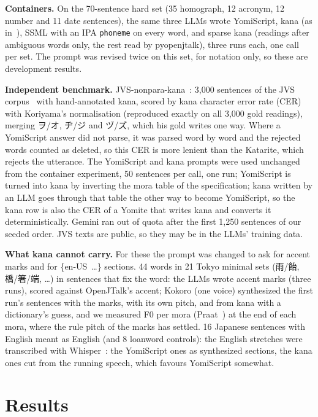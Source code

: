 \documentclass{Interspeech}
\newcommand{\ys}[1]{\mbox{\ipafont #1}}
\begin{document}
\textbf{Containers.} On the 70-sentence hard set (35 homograph, 12 acronym, 12 number and 11 date sentences), the
same three LLMs wrote YomiScript, kana (as in~\cite{koriyama2026g2p}), SSML with an IPA \texttt{phoneme} on every word,
and sparse kana (readings after ambiguous words only, the rest read by pyopenjtalk), three runs each, one call per set.
The prompt was revised twice on this set, for notation only, so these are development results.

\textbf{Independent benchmark.} JVS-nonpara-kana~\cite{koriyama2026g2p}: 3{,}000 sentences of the JVS
corpus~\cite{takamichi2020jvs} with hand-annotated kana, scored by kana character error rate (CER) with Koriyama's
normalisation (reproduced exactly on all 3{,}000 gold readings), merging ヲ/オ, ヂ/ジ and ヅ/ズ, which his gold
writes one way. Where a YomiScript answer did not parse, it was parsed word by word and the rejected words counted as
deleted, so this CER is more lenient than the Katarite, which rejects the utterance. The YomiScript and kana prompts were
used unchanged from the container experiment, 50 sentences per call, one run; YomiScript is turned into kana by
inverting the mora table of the specification; kana written by an LLM goes through that table the other way to
become YomiScript, so the kana row is also the CER of a Yomite that writes kana and converts it deterministically.
Gemini ran out of quota after the first 1{,}250 sentences of our seeded order. JVS texts are public, so they may be in the LLMs' training data.

\textbf{What kana cannot carry.} For these the prompt was changed to ask for accent marks and for \ys{\{en-US …\}}
sections. 44 words in 21 Tokyo minimal sets (雨/飴, 橋/箸/端, \dots) in sentences that fix
the word: the LLMs wrote accent marks (three runs), scored against OpenJTalk's accent; Kokoro (one voice) synthesized
the first run's sentences with the marks, with its own pitch, and from kana with a dictionary's guess, and we measured F0 per mora
(Praat~\cite{boersma2001praat}) at the end of each mora, where the rule pitch of the marks has settled. 16 Japanese
sentences with English meant as English (and 8 loanword controls): the
English stretches were transcribed with Whisper~\cite{radford2023whisper}: the YomiScript ones as synthesized
sections, the kana ones cut from the running speech, which favours YomiScript somewhat.

\section{Results}
\end{document}
